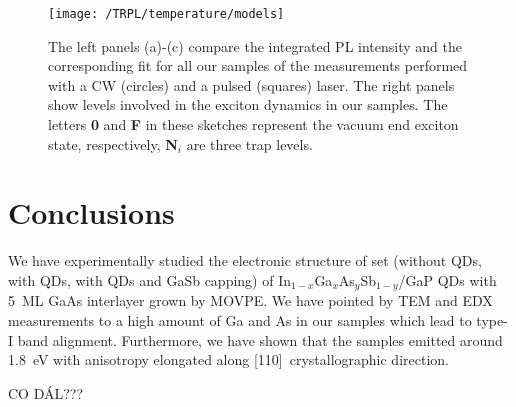 \begin{figure}
	\centering
	\texttt{[image: /TRPL/temperature/models]} %
	\caption{The left panels (a)-(c) compare the integrated PL intensity and the corresponding fit for all our samples of the measurements performed with a CW (circles) and a pulsed (squares) laser. The right panels show levels involved in the exciton dynamics in our samples. The letters \textbf{0} and \textbf{F} in these sketches represent the vacuum end exciton state, respectively, \textbf{N$_i$} are three trap levels.}
	\label{fig:Arrhenius_PLandTRPL}
\end{figure}
\newpage 

\section{Conclusions}
We have experimentally studied the electronic structure of set (without QDs, with QDs, with QDs and GaSb capping) of In$_{1-x}$Ga$_{x}$As$_y$Sb$_{1-y}$/GaP QDs with 5~ML GaAs interlayer grown by MOVPE. We have pointed by TEM and EDX measurements to a high amount of Ga and As in our samples which lead to type-I band alignment. Furthermore, we have shown that the samples emitted around 1.8~eV with anisotropy elongated along [110]~crystallographic direction.   %

CO DÁL???